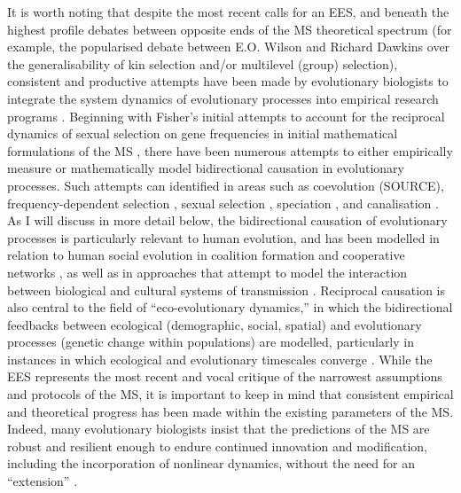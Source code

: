 It is worth noting that despite the most recent calls for an EES, and beneath the highest profile debates between opposite ends of the MS theoretical spectrum (for example, the popularised debate between E.O. Wilson and Richard Dawkins over the generalisability of kin selection and/or multilevel (group) selection), consistent and productive attempts have been made by evolutionary biologists to integrate the system dynamics of evolutionary processes into empirical research programs \citep{Wray2014,Svensson2017}.  Beginning with Fisher's initial attempts to account for the reciprocal dynamics of sexual selection on gene frequencies in initial mathematical formulations of the MS \citep{Fisher1930}, there have been numerous attempts to either empirically measure or mathematically model bidirectional causation in evolutionary processes.  Such attempts can identified in areas such as coevolution (SOURCE), frequency-dependent selection \citep{Prum2010}, sexual selection \citep{Svensson2009}, speciation \citep{Mayr1965}, and canalisation \citep{Waddington1950}.  As I will discuss in more detail below, the bidirectional causation of evolutionary processes is particularly relevant to human evolution, and has been modelled in relation to human social evolution in coalition formation and cooperative networks \citep{Gavrilets2008}, as well as in approaches that attempt to model the interaction between biological and cultural systems of transmission \citep{Cavalli-Sforza1981,Cavalli-Sforza1989,Boyd1988,Henrich2007,Claidiere2007}.  Reciprocal causation is also central to the field of ``eco-evolutionary dynamics,'' in which the bidirectional feedbacks between ecological (demographic, social, spatial) and evolutionary processes (genetic change within populations) are modelled, particularly in instances in which ecological and evolutionary timescales converge \citep{Hendry2017}.
While the EES represents the most recent and vocal critique of the narrowest assumptions and protocols of the MS, it is important to keep in mind that consistent empirical and theoretical progress has been made within the existing parameters of the MS.  Indeed, many evolutionary biologists insist that the predictions of the MS are robust and resilient enough to endure continued innovation and modification, including the incorporation of nonlinear dynamics, without the need for an ``extension'' \citep{Wray2014,Lewens2017,Svensson2017}.

